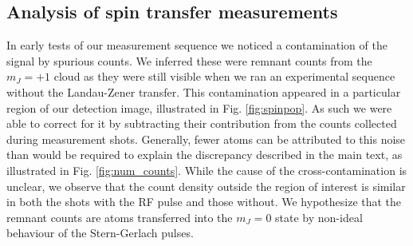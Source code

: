 	




\subsection{Analysis of spin transfer measurements}

	In early tests of our measurement sequence we noticed a contamination of the signal by spurious counts. We inferred these were remnant counts from the $m_J=+1$ cloud as they were still visible when we ran an experimental sequence without the Landau-Zener transfer. This contamination appeared in a particular region of our detection image, illustrated in Fig. \ref{fig:spinpop}. As such we were able to correct for it by subtracting their contribution from the counts collected during measurement shots. Generally, fewer atoms can be attributed to this noise than would be required to explain the discrepancy described in the main text, as illustrated in Fig. \ref{fig:num_counts}. While the cause of the cross-contamination is unclear, we observe that the count density outside the region of interest is similar in both the shots with the RF pulse and those without. We hypothesize that the remnant counts are atoms transferred into the $m_J=0$ state by non-ideal behaviour of the Stern-Gerlach pulses. 

